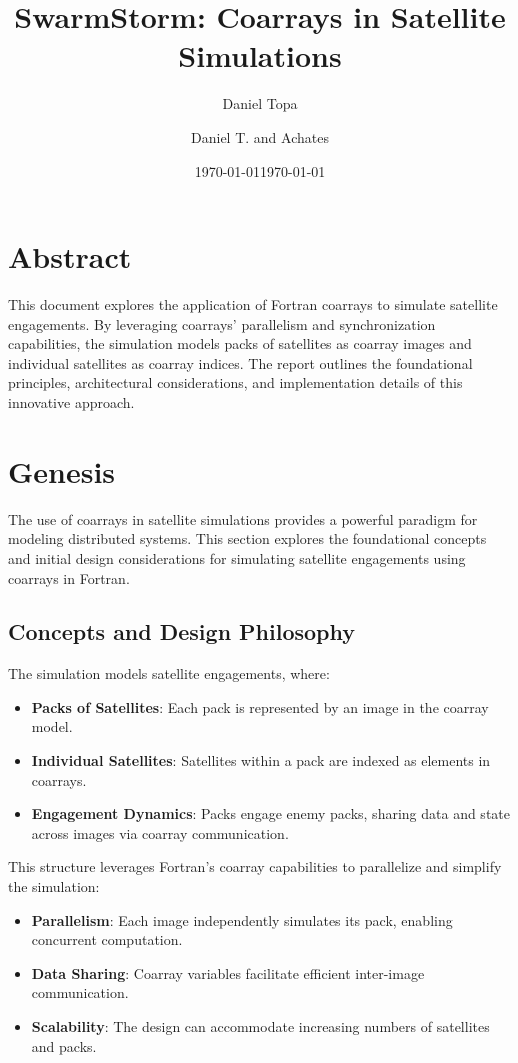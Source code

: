 \documentclass{article}
\title{SwarmStorm: Coarrays in Satellite Simulations}
\author{Daniel Topa\\\TopaHIIEmail}
\affil{\missiontech}
\date{\today}
\author{Daniel T. and Achates}
\date{\today}
\begin{document}
\maketitle

\tableofcontents

\section*{Abstract}
This document explores the application of Fortran coarrays to simulate satellite engagements. By leveraging coarrays' parallelism and synchronization capabilities, the simulation models packs of satellites as coarray images and individual satellites as coarray indices. The report outlines the foundational principles, architectural considerations, and implementation details of this innovative approach.

\section{Genesis}

The use of coarrays in satellite simulations provides a powerful paradigm for modeling distributed systems. This section explores the foundational concepts and initial design considerations for simulating satellite engagements using coarrays in Fortran.

\subsection{Concepts and Design Philosophy}

The simulation models satellite engagements, where:
\begin{itemize}
    \item \textbf{Packs of Satellites}: Each pack is represented by an image in the coarray model.
    \item \textbf{Individual Satellites}: Satellites within a pack are indexed as elements in coarrays.
    \item \textbf{Engagement Dynamics}: Packs engage enemy packs, sharing data and state across images via coarray communication.
\end{itemize}

This structure leverages Fortran’s coarray capabilities to parallelize and simplify the simulation:
\begin{itemize}
    \item \textbf{Parallelism}: Each image independently simulates its pack, enabling concurrent computation.
    \item \textbf{Data Sharing}: Coarray variables facilitate efficient inter-image communication.
    \item \textbf{Scalability}: The design can accommodate increasing numbers of satellites and packs.
\end{itemize}
\end{document}
